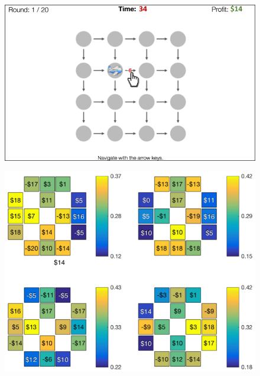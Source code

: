 \documentclass[final]{beamer}
\newlength{\onecolwid}
\newlength{\twocolwid}
\begin{document}
\begin{frame}[t]
\begin{columns}[t]
\begin{column}{\twocolwid}
\begin{columns}[t,totalwidth=\twocolwid]
\begin{column}{\onecolwid}
      \begin{figure}
        \includegraphics[width=0.9\linewidth]{figs/paradigm_illustration2.png}
      \end{figure}

      \begin{figure}
        \includegraphics[width=0.9\linewidth]{figs/click_locations_noFB_before1stFlight_small.png}
      \end{figure}
    
    \end{column} %

  \end{columns}


\end{column}
\end{columns}
\end{frame}
\end{document}

